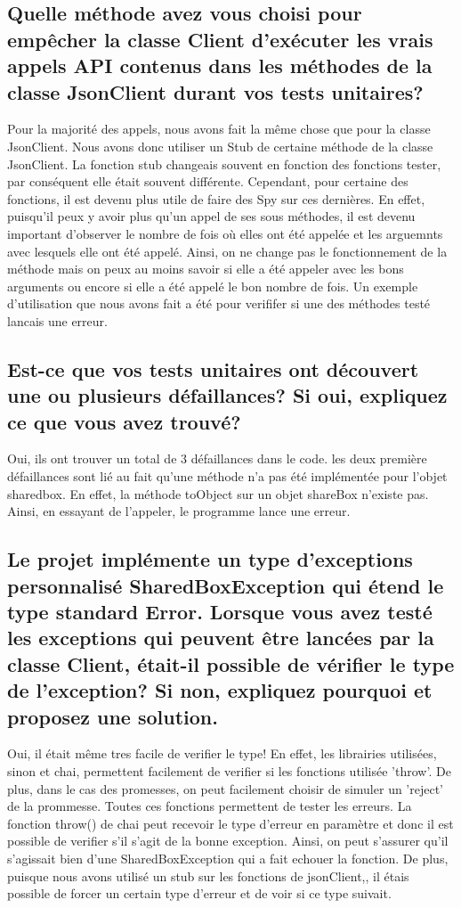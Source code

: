 \documentclass{article}
\begin{document}
\subsection*{Quelle méthode avez vous choisi pour empêcher la classe Client d’exécuter les
  vrais appels API contenus dans les méthodes de la classe JsonClient durant
  vos tests unitaires?}
Pour la majorité des appels, nous avons fait la même chose que pour la classe JsonClient.
Nous avons donc utiliser un Stub de certaine méthode de la classe JsonClient.
La fonction stub changeais souvent en fonction des fonctions tester, par conséquent elle était souvent différente.
Cependant, pour certaine des fonctions, il est devenu plus utile de faire des Spy sur ces dernières.
En effet, puisqu'il peux y avoir plus qu'un appel de ses sous méthodes, il est devenu important d'observer le nombre de fois où elles ont été appelée et les arguemnts avec lesquels elle ont été appelé.
Ainsi, on ne change pas le fonctionnement de la méthode mais on peux au moins savoir si elle a été appeler avec les bons arguments ou encore si elle a été appelé le bon nombre de fois.
Un exemple d'utilisation que nous avons fait a été pour verififer si une des méthodes testé lancais une erreur.
\subsection*{Est-ce que vos tests unitaires ont découvert une ou plusieurs défaillances? Si oui,
  expliquez ce que vous avez trouvé?}
Oui, ils ont trouver un total de 3 défaillances dans le code.
les deux première défaillances sont lié au fait qu'une méthode n'a pas été implémentée pour l'objet sharedbox.
En effet, la méthode toObject sur un objet shareBox n'existe pas.
Ainsi, en essayant de l'appeler, le programme lance une erreur.
\subsection*{Le projet implémente un type d’exceptions personnalisé SharedBoxException
  qui étend le type standard Error. Lorsque vous avez testé les exceptions qui
  peuvent être lancées par la classe Client, était-il possible de vérifier le type de
  l’exception? Si non, expliquez pourquoi et proposez une solution.}
Oui, il était même tres facile de verifier le type!
En effet, les librairies utilisées, sinon et chai, permettent facilement de verifier si les fonctions utilisée 'throw'.
De plus, dans le cas des promesses, on peut facilement choisir de simuler un 'reject' de la prommesse.
Toutes ces fonctions permettent de tester les erreurs.
La fonction throw() de chai peut recevoir le type d'erreur en paramètre et donc il est possible de verifier s'il s'agit de la bonne exception.
Ainsi, on peut s'assurer qu'il s'agissait bien d'une SharedBoxException qui a fait echouer la fonction.
De plus, puisque nous avons utilisé un stub sur les fonctions de jsonClient,, il étais possible de forcer un certain type d'erreur et de voir si ce type suivait.
\end{document}
